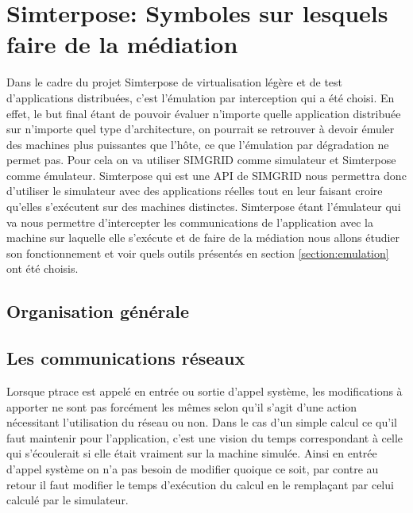 
\section{Simterpose: Symboles sur lesquels faire de la médiation}
\label{section:simterpose}
Dans le cadre du projet Simterpose de virtualisation légère et de test
d'applications distribuées, c'est l'émulation par interception qui a été
choisi. En effet, le but final étant de pouvoir évaluer n'importe quelle
application distribuée sur n'importe quel type d'architecture, on pourrait se
retrouver à devoir émuler des machines plus puissantes que l'hôte, ce que
l'émulation par dégradation ne permet pas. Pour cela on va utiliser SIMGRID
comme simulateur et Simterpose comme émulateur. Simterpose qui est une API de SIMGRID nous permettra donc d'utiliser le simulateur avec des applications
réelles tout en leur faisant croire qu'elles s'exécutent sur des machines
distinctes. Simterpose étant l'émulateur qui va nous permettre d'intercepter les
communications de l'application avec la machine sur laquelle elle s'exécute et
de faire de la médiation nous allons étudier son fonctionnement et voir quels
outils présentés en section \ref{section:emulation} ont été choisis.

\subsection{Organisation générale}

\subsection{Les communications réseaux}

Lorsque ptrace est appelé en entrée ou sortie d'appel système, les modifications
à apporter ne sont pas forcément les mêmes selon qu'il s'agit d'une action
nécessitant l'utilisation du réseau ou non. Dans le cas d'un simple calcul ce
qu'il faut maintenir pour l'application, c'est une vision du temps correspondant
à celle qui s'écoulerait si elle était vraiment sur la machine simulée. Ainsi en
entrée d'appel système on n'a pas besoin de modifier quoique ce soit, par contre
au retour il faut modifier le temps d'exécution du calcul en le remplaçant par
celui calculé par le simulateur.

